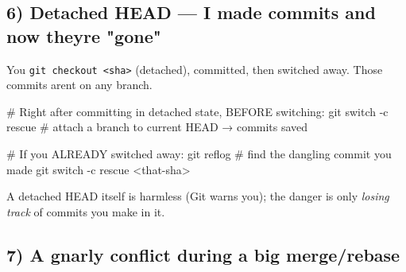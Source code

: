 \documentclass[11pt]{article}
\newenvironment{Shaded}{\begin{snugshade}}{\end{snugshade}}
\newcommand{\AttributeTok}[1]{\textcolor[rgb]{0.16,0.50,0.73}{#1}}
\newcommand{\CommentTok}[1]{\textcolor[rgb]{0.48,0.49,0.49}{#1}}
\newcommand{\FunctionTok}[1]{\textcolor[rgb]{0.56,0.27,0.68}{#1}}
\newcommand{\NormalTok}[1]{\textcolor[rgb]{0.81,0.81,0.76}{#1}}
\newcommand{\OperatorTok}[1]{\textcolor[rgb]{0.81,0.81,0.76}{#1}}
\begin{document}
\subsection{6) Detached HEAD --- I made commits and now they\textquotesingle re "gone"}\label{6-detached-head--i-made-commits-and-now-theyre-gone}

You \texttt{git\ checkout\ \textless{}sha\textgreater{}} (detached), committed, then switched away. Those commits aren\textquotesingle t on any branch.


\begin{Shaded}
\begin{Highlighting}[]
\CommentTok{\# Right after committing in detached state, BEFORE switching:}
\FunctionTok{git}\NormalTok{ switch }\AttributeTok{{-}c}\NormalTok{ rescue        }\CommentTok{\# attach a branch to current HEAD → commits saved}

\CommentTok{\# If you ALREADY switched away:}
\FunctionTok{git}\NormalTok{ reflog                  }\CommentTok{\# find the dangling commit you made}
\FunctionTok{git}\NormalTok{ switch }\AttributeTok{{-}c}\NormalTok{ rescue }\OperatorTok{\textless{}}\NormalTok{that{-}sha}\OperatorTok{\textgreater{}}
\end{Highlighting}
\end{Shaded}

A detached HEAD itself is harmless (Git warns you); the danger is only \emph{losing track} of commits you make in it.

\subsection{7) A gnarly conflict during a big merge/rebase}\label{7-a-gnarly-conflict-during-a-big-mergerebase}

\end{document}
